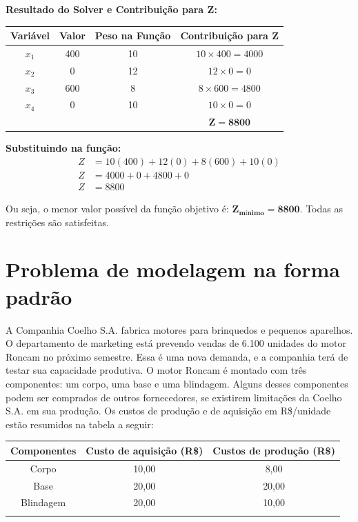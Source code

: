 \documentclass[12pt, a4paper]{article}
\begin{document}
\textbf{Resultado do Solver e Contribuição para Z:}
\begin{center}
\begin{tabular}{c|c|c|c}
\hline
\textbf{Variável} & \textbf{Valor} & \textbf{Peso na Função} & \textbf{Contribuição para Z} \\
\hline
$x_1$ & 400 & 10 & $10 \times 400 = 4000$ \\
$x_2$ & 0 & 12 & $12 \times 0 = 0$ \\
$x_3$ & 600 & 8 & $8 \times 600 = 4800$ \\
$x_4$ & 0 & 10 & $10 \times 0 = 0$ \\
\hline
\multicolumn{3}{c|}{} & $\mathbf{Z = 8800}$ \\
\hline
\end{tabular}
\end{center}

\textbf{Substituindo na função:}
\begin{align*}
Z &= 10(400) + 12(0) + 8(600) + 10(0) \\
Z &= 4000 + 0 + 4800 + 0 \\
Z &= 8800
\end{align*}

Ou seja, o menor valor possível da função objetivo é: $\mathbf{Z_{mínimo} = 8800}$. Todas as restrições são satisfeitas.


\cleardoublepage
\section[Problema Extra]{Problema de modelagem na forma padrão}
A Companhia Coelho S.A. fabrica motores para brinquedos e pequenos aparelhos. O departamento de marketing está prevendo vendas de 6.100 unidades do motor Roncam no próximo semestre. Essa é uma nova demanda, e a companhia terá de testar sua capacidade produtiva. O motor Roncam é montado com três componentes: um corpo, uma base e uma blindagem. Alguns desses componentes podem ser comprados de outros fornecedores, se existirem limitações da Coelho S.A. em sua produção. Os custos de produção e de aquisição em R\$/unidade estão resumidos na tabela a seguir:

\begin{table}[htb]
  \centering
  \begin{tabular}{ccc}
    \toprule
    Componentes & Custo de aquisição (R\$) & Custos de produção (R\$) \\
    \midrule
    Corpo & 10,00 & 8,00 \\
    Base & 20,00 & 20,00 \\
    Blindagem & 20,00 & 10,00\\
    \noalign{\smallskip}\bottomrule
  \end{tabular}
\end{table}
\end{document}
